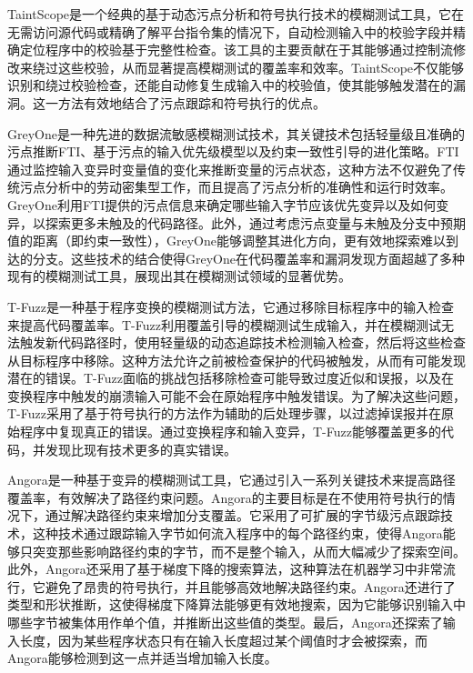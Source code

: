 \documentclass[10.5pt,compsoc]{CjC}
\theoremstyle{mystyle}
\begin{document}
TaintScope\cite{TaintScope}是一个经典的基于动态污点分析和符号执行技术的模糊测试工具，它在无需访问源代码或精确了解平台指令集的情况下，自动检测输入中的校验字段并精确定位程序中的校验基于完整性检查。该工具的主要贡献在于其能够通过控制流修改来绕过这些校验，从而显著提高模糊测试的覆盖率和效率。TaintScope不仅能够识别和绕过校验检查，还能自动修复生成输入中的校验值，使其能够触发潜在的漏洞。这一方法有效地结合了污点跟踪和符号执行的优点。

GreyOne\cite{GREYONE}是一种先进的数据流敏感模糊测试技术，其关键技术包括轻量级且准确的污点推断FTI、基于污点的输入优先级模型以及约束一致性引导的进化策略。FTI通过监控输入变异时变量值的变化来推断变量的污点状态，这种方法不仅避免了传统污点分析中的劳动密集型工作，而且提高了污点分析的准确性和运行时效率。GreyOne利用FTI提供的污点信息来确定哪些输入字节应该优先变异以及如何变异，以探索更多未触及的代码路径。此外，通过考虑污点变量与未触及分支中预期值的距离（即约束一致性），GreyOne能够调整其进化方向，更有效地探索难以到达的分支。这些技术的结合使得GreyOne在代码覆盖率和漏洞发现方面超越了多种现有的模糊测试工具，展现出其在模糊测试领域的显著优势。

T-Fuzz\cite{T-Fuzz}是一种基于程序变换的模糊测试方法，它通过移除目标程序中的输入检查来提高代码覆盖率。T-Fuzz利用覆盖引导的模糊测试生成输入，并在模糊测试无法触发新代码路径时，使用轻量级的动态追踪技术检测输入检查，然后将这些检查从目标程序中移除。这种方法允许之前被检查保护的代码被触发，从而有可能发现潜在的错误。T-Fuzz面临的挑战包括移除检查可能导致过度近似和误报，以及在变换程序中触发的崩溃输入可能不会在原始程序中触发错误。为了解决这些问题，T-Fuzz采用了基于符号执行的方法作为辅助的后处理步骤，以过滤掉误报并在原始程序中复现真正的错误。通过变换程序和输入变异，T-Fuzz能够覆盖更多的代码，并发现比现有技术更多的真实错误。

Angora是一种基于变异的模糊测试工具，它通过引入一系列关键技术来提高路径覆盖率，有效解决了路径约束问题。Angora的主要目标是在不使用符号执行的情况下，通过解决路径约束来增加分支覆盖。它采用了可扩展的字节级污点跟踪技术，这种技术通过跟踪输入字节如何流入程序中的每个路径约束，使得Angora能够只突变那些影响路径约束的字节，而不是整个输入，从而大幅减少了探索空间。此外，Angora还采用了基于梯度下降的搜索算法，这种算法在机器学习中非常流行，它避免了昂贵的符号执行，并且能够高效地解决路径约束。Angora还进行了类型和形状推断，这使得梯度下降算法能够更有效地搜索，因为它能够识别输入中哪些字节被集体用作单个值，并推断出这些值的类型。最后，Angora还探索了输入长度，因为某些程序状态只有在输入长度超过某个阈值时才会被探索，而Angora能够检测到这一点并适当增加输入长度。
\vspace {10mm}
\end{document}
